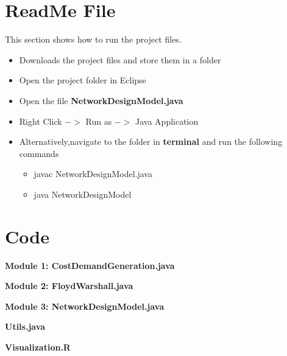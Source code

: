 \documentclass[12pt,letterpaper,titlepage,en-US]{article}
\begin{document}
  \section{ReadMe File}
  This section shows how to run the project files.
  \begin{itemize}
  \item Downloads the project files and store them in a folder
  \item Open the project folder in Eclipse
  \item Open the file \textbf{NetworkDesignModel.java}
  \item Right Click $->$ Run as $->$ Java Application
  \item Alternatively,navigate to the folder in \textbf{terminal} and run the following commands
  \begin{itemize}
  \item javac NetworkDesignModel.java
  \item java NetworkDesignModel
  \end{itemize}
  \end{itemize}

  

 
\section{Code}

\textbf{Module 1: CostDemandGeneration.java}


\pagebreak
\textbf{Module 2: FloydWarshall.java}


\pagebreak
\textbf{Module 3: NetworkDesignModel.java}


\pagebreak
\textbf{Utils.java}


\textbf{Visualization.R}

\end{document}
